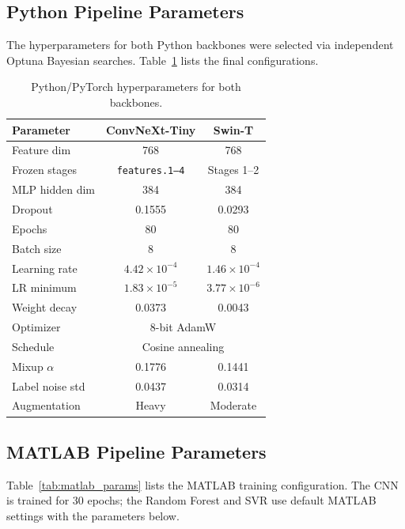 \documentclass[9pt, a4paper, twocolumn]{article}
\begin{document}
\subsection{Python Pipeline Parameters}

The hyperparameters for both Python backbones were selected via independent Optuna Bayesian searches. Table~\ref{tab:python_params} lists the final configurations.

\begin{table}[H]
\centering
\footnotesize
\caption{Python/PyTorch hyperparameters for both backbones.}
\label{tab:python_params}
\begin{tabular}{lcc}
\toprule
\textbf{Parameter} & \textbf{ConvNeXt-Tiny} & \textbf{Swin-T} \\
\midrule
Feature dim         & 768 & 768 \\
Frozen stages       & \texttt{features.1--4} & Stages 1--2 \\
MLP hidden dim      & 384 & 384 \\
Dropout             & 0.1555 & 0.0293 \\
Epochs              & 80 & 80 \\
Batch size          & 8 & 8 \\
Learning rate       & $4.42\times10^{-4}$ & $1.46\times10^{-4}$ \\
LR minimum          & $1.83\times10^{-5}$ & $3.77\times10^{-6}$ \\
Weight decay        & 0.0373 & 0.0043 \\
Optimizer           & \multicolumn{2}{c}{8-bit AdamW} \\
Schedule            & \multicolumn{2}{c}{Cosine annealing} \\
Mixup $\alpha$      & 0.1776 & 0.1441 \\
Label noise std     & 0.0437 & 0.0314 \\
Augmentation        & Heavy & Moderate \\
\bottomrule
\end{tabular}
\end{table}


\subsection{MATLAB Pipeline Parameters}

Table~\ref{tab:matlab_params} lists the MATLAB training configuration. The CNN is trained for 30 epochs; the Random Forest and SVR use default MATLAB settings with the parameters below.
\end{document}
